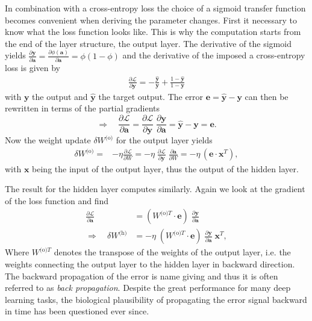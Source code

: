 In combination with a cross-entropy loss the choice of a sigmoid transfer function becomes convenient when deriving the parameter changes. First it necessary to know what the loss function looks like. This is why the computation starts from the end of the layer structure, the output layer. The derivative of the sigmoid yields $\frac{\partial \mathbf{y}}{\partial \mathbf{a}} = \frac{\partial \phi(\mathbf{a})}{\partial \mathbf{a}} = \phi (1 - \phi)$ and the derivative of the imposed a cross-entropy loss is given by
\begin{align}
\frac{\partial\mathcal{L}}{\partial \mathbf{y}} = 
- \frac{\hat{\mathbf{y}}}{\mathbf{y}} + 
\frac{1 - \hat{\mathbf{y}}}{1 - \mathbf{y}}
\end{align}
with $\mathbf{y}$ the output and $\hat{\mathbf{y}}$ the target output. The error $\mathbf{e} = \hat{\mathbf{y}} - \mathbf{y}$ can then be rewritten in terms of the partial gradients
\begin{equation}
\Rightarrow \quad \frac{\partial\mathcal{L}}{\partial \mathbf{a}} =
\frac{\partial\mathcal{L}}{\partial \mathbf{y}} 
\; \frac{\partial \mathbf{y}}{\partial \mathbf{a}} =
\hat{\mathbf{y}} - \mathbf{y} = \mathbf{e}.
\end{equation}
Now the weight update $\delta W^{\text{(o)}}$ for the output layer yields 
\begin{align}
\delta W^{\text{(o)}} =& - \eta \frac{\partial \mathcal{L}}{\partial W} 
= - \eta \;
\frac{\partial\mathcal{L}}{\partial \mathbf{y}} \;
\frac{\partial \mathbf{a}}{\partial W}
= - \eta \, (\mathbf{e} \cdot \mathbf{x}^T),
\end{align}
with $\mathbf{x}$ being the input of the output layer, thus the output of the hidden layer.

The result for the hidden layer computes similarly. Again we look at the gradient of the loss function and find
\begin{align}
\frac{\partial\mathcal{L}}{\partial \mathbf{a}} &= \left(W^{\text{(o)}T} \cdot \mathbf{e}\right) \;
\frac{\partial \mathbf{y} }{\partial \mathbf{a}}\\
\Rightarrow \quad \delta W^{\text{(h)}} &= - \eta \;
\left(W^{\text{(o)}T} \cdot \mathbf{e}\right) \;
\frac{\partial \mathbf{y} }{\partial \mathbf{a}} \;
\mathbf{x}^T,
\end{align}
Where $W^{\text{(o)}T}$ denotes the transpose of the weights of the output layer, i.e. the weights connecting the output layer to the hidden layer in backward direction. The backward propagation of the error is name giving and thus it is often referred to as \textit{back propagation}. Despite the great performance for many deep learning tasks, the biological plausibility of propagating the error signal backward in time has been questioned ever since. 

